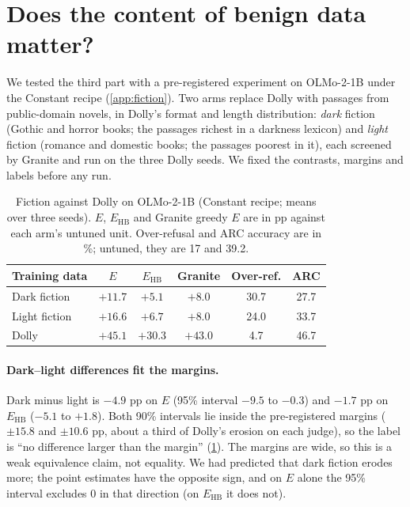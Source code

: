 \documentclass{article}
\newcommand{\Ehb}{E_{\mathrm{HB}}}
\begin{document}
\section{Does the content of benign data matter?}
\label{sec:fiction}

We tested the third part with a pre-registered experiment on OLMo-2-1B under
the Constant recipe (\cref{app:fiction}). Two arms replace Dolly with passages
from public-domain novels, in Dolly's format and length distribution:
\emph{dark} fiction (Gothic and horror books; the passages richest in a
darkness lexicon) and \emph{light} fiction (romance and domestic books; the
passages poorest in it), each screened by Granite and run on the three Dolly
seeds. We fixed the contrasts, margins and labels before any run.

\begin{table}[t]
  \caption{Fiction against Dolly on OLMo-2-1B (Constant recipe; means over
    three seeds). $E$, $\Ehb$ and Granite greedy $E$ are in pp against each
    arm's untuned unit. Over-refusal and ARC accuracy are in \%; untuned, they
    are 17 and 39.2.}
  \label{tab:fiction}
  \centering
  \small
  \setlength{\tabcolsep}{4pt}
  \begin{tabular}{@{}l c c c c c@{}}
    \toprule
    Training data & $E$ & $\Ehb$ & Granite & Over-ref. & ARC \\
    \midrule
    Dark fiction & $+11.7$ & $+5.1$ & $+8.0$ & 30.7 & 27.7 \\
    Light fiction & $+16.6$ & $+6.7$ & $+8.0$ & 24.0 & 33.7 \\
    Dolly & $+45.1$ & $+30.3$ & $+43.0$ & 4.7 & 46.7 \\
    \bottomrule
  \end{tabular}
\end{table}

\paragraph{Dark--light differences fit the margins.} Dark minus light is $-4.9$ pp on
$E$ (95\% interval $-9.5$ to $-0.3$) and $-1.7$ pp on $\Ehb$ ($-5.1$ to
$+1.8$). Both 90\% intervals lie inside the pre-registered margins ($\pm 15.8$
and $\pm 10.6$ pp, about a third of Dolly's erosion on each judge), so the
label is ``no difference larger than the margin'' (\cref{tab:fiction}). The
margins are wide, so this is a weak equivalence claim, not equality. We had
predicted that dark fiction erodes
more; the point estimates have the opposite sign, and on $E$ alone the 95\%
interval excludes 0 in that direction (on $\Ehb$ it does not).
\end{document}
